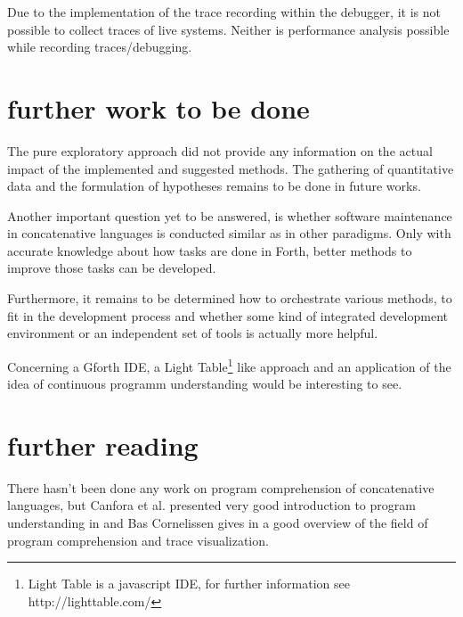 Due to the implementation of the trace recording within the debugger, it is not possible to collect traces of live systems. Neither is performance analysis possible while recording traces/debugging.
 

\section{further work to be done}

The pure exploratory approach did not provide any information on the actual impact of the implemented and suggested methods. The gathering of quantitative data and the formulation of hypotheses remains to be done in future works.

Another important question yet to be answered, is whether software maintenance in concatenative languages is conducted similar as in other paradigms. Only with accurate knowledge about how tasks are done in Forth, better methods to improve those tasks can be developed.

Furthermore, it remains to be determined how to orchestrate various methods, to fit in the development process and whether some kind of integrated development environment or an independent set of tools is actually more helpful.

Concerning a Gforth IDE, a Light Table\footnote{Light Table is a javascript IDE, for further information see http://lighttable.com/} like approach and an application of the idea of continuous programm understanding\cite{Muller:2000:RER:336512.336526} would be interesting to see.


\section{further reading}

There hasn't been done any work on program comprehension of concatenative languages, but Canfora et al. presented  very good introduction to program understanding in \cite{Canfora:2011:ACS:1924421.1924451} and Bas Cornelissen gives in \cite{Cornelissen2009} a good overview of the field of program comprehension and trace visualization.